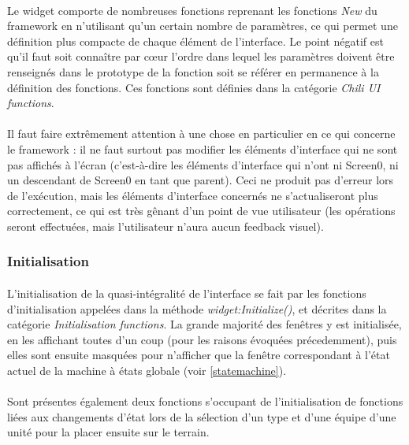 \documentclass[a4paper]{article}
\begin{document}
\paragraph{}
Le widget comporte de nombreuses fonctions reprenant les fonctions \textit{New} du framework en n'utilisant qu'un certain nombre de paramètres, ce qui permet une définition plus compacte de chaque élément de l'interface. Le point négatif est qu'il faut soit connaître par cœur l'ordre dans lequel les paramètres doivent être renseignés dans le prototype de la fonction soit se référer en permanence à la définition des fonctions. Ces fonctions sont définies dans la catégorie \textit{Chili UI functions}.
\paragraph{}
Il faut faire extrêmement attention à une chose en particulier en ce qui concerne le framework : il ne faut surtout pas modifier les éléments d'interface qui ne sont pas affichés à l'écran (c'est-à-dire les éléments d'interface qui n'ont ni Screen0, ni un descendant de Screen0 en tant que parent). Ceci ne produit pas d'erreur lors de l'exécution, mais les éléments d'interface concernés ne s'actualiseront plus correctement, ce qui est très gênant d'un point de vue utilisateur (les opérations seront effectuées, mais l'utilisateur n'aura aucun feedback visuel).
\subsubsection{Initialisation}
\paragraph{}
L'initialisation de la quasi-intégralité de l'interface se fait par les fonctions d'initialisation appelées dans la méthode \textit{widget:Initialize()}, et décrites dans la catégorie \textit{Initialisation functions}. La grande majorité des fenêtres y est initialisée, en les affichant toutes d'un coup (pour les raisons évoquées précedemment), puis elles sont ensuite masquées pour n'afficher que la fenêtre correspondant à l'état actuel de la machine à états globale (voir \ref{statemachine}).
\paragraph{}
Sont présentes également deux fonctions s'occupant de l'initialisation de fonctions liées aux changements d'état lors de la sélection d'un type et d'une équipe d'une unité pour la placer ensuite sur le terrain.
\end{document}
